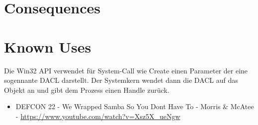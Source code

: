 \section{Consequences}
\begin{itemize}
\end{itemize}

\section{Known Uses}
Die Win32 API verwendet für System-Call wie Create einen Parameter der eine sogennante DACL darstellt. Der Systemkern wendet dann die DACL auf das Objekt an und gibt dem Prozess einen Handle zurück.
\\
\begin{additional}[Links]
  \begin{itemize}
    \item DEFCON 22 - We Wrapped Samba So You Dont Have To - Morris \& McAtee - \url{https://www.youtube.com/watch?v=Xsz5X_ueNgw}
  \end{itemize}
\end{additional}
